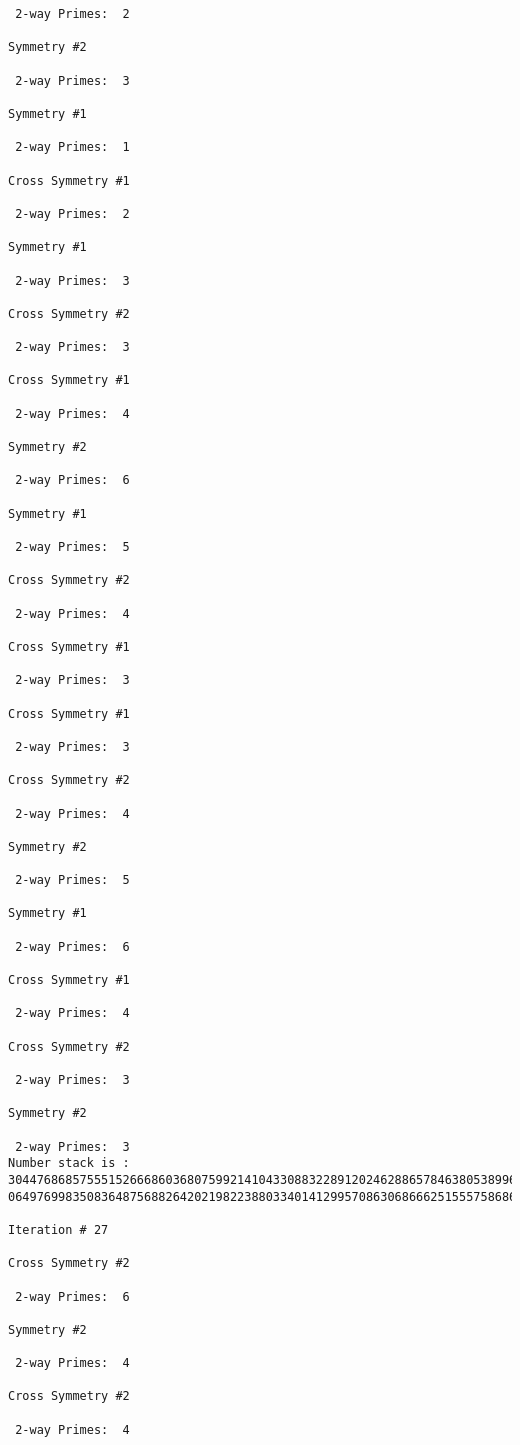 \begin{verbatim}
 2-way Primes: 	2

Symmetry #2

 2-way Primes: 	3

Symmetry #1

 2-way Primes: 	1

Cross Symmetry #1

 2-way Primes: 	2

Symmetry #1

 2-way Primes: 	3

Cross Symmetry #2

 2-way Primes: 	3

Cross Symmetry #1

 2-way Primes: 	4

Symmetry #2

 2-way Primes: 	6

Symmetry #1

 2-way Primes: 	5

Cross Symmetry #2

 2-way Primes: 	4

Cross Symmetry #1

 2-way Primes: 	3

Cross Symmetry #1

 2-way Primes: 	3

Cross Symmetry #2

 2-way Primes: 	4

Symmetry #2

 2-way Primes: 	5

Symmetry #1

 2-way Primes: 	6

Cross Symmetry #1

 2-way Primes: 	4

Cross Symmetry #2

 2-way Primes: 	3

Symmetry #2

 2-way Primes: 	3
Number stack is :
30447686857555152666860368075992141043308832289120246288657846380538996794608835958544046240163340857
06497699835083648756882642021982238803340141299570863068666251555758686744037580433610426404458595388

Iteration #	27

Cross Symmetry #2

 2-way Primes: 	6

Symmetry #2

 2-way Primes: 	4

Cross Symmetry #2

 2-way Primes: 	4


\end{verbatim}
